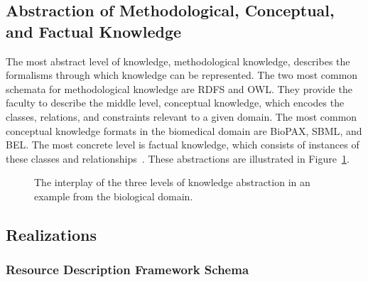 \subsection{Abstraction of Methodological, Conceptual, and Factual Knowledge}

The most abstract level of knowledge, methodological knowledge, describes the formalisms through which knowledge can be represented.
The two most common schemata for methodological knowledge are \ac{RDFS} and \ac{OWL}.
They provide the faculty to describe the middle level, conceptual knowledge, which encodes the classes, relations, and constraints relevant to a given domain.
The most common conceptual knowledge formats in the biomedical domain are \ac{BioPAX}, \ac{SBML}, and \ac{BEL}.
The most concrete level is factual knowledge, which consists of instances of these classes and relationships~\cite{Marchetti2008}.
These abstractions are illustrated in Figure~\ref{fig:knowledge_types}.

\begin{figure}
    \captionsetup{format=plain}
    \caption[Levels of Knowledge Abstraction]{The interplay of the three levels of knowledge abstraction in an example from the biological domain.}
    \label{fig:knowledge_types}
\end{figure}

\subsection{Realizations}

\subsubsection{Resource Description Framework Schema}

